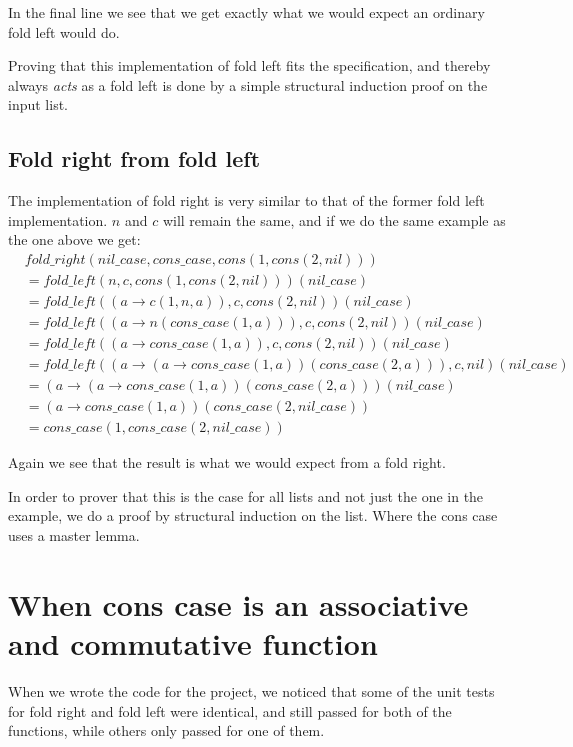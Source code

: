 \documentclass[a4paper]{article}
\begin{document}
In the final line we see that we get exactly what we would expect an ordinary
fold left would do.

Proving that this implementation of fold left fits the specification, and
thereby always \emph{acts} as a fold left is done by a simple structural 
induction proof on the input list.

\subsection{Fold right from fold left}
The implementation of fold right is very similar to that of the former fold left
implementation. $n$ and $c$ will remain the same, and if we do the same example
as the one above we get:
\begin{align*}
        &fold\_right(nil\_case, cons\_case, cons(1,cons(2, nil))) 
  \\ &= fold\_left(n, c, cons(1,cons(2, nil)))(nil\_case)
  \\ &= fold\_left((a \rightarrow c(1, n, a)), c, cons(2,nil))(nil\_case)
  \\ &= fold\_left((a \rightarrow n (cons\_case(1, a))), c, cons(2,nil))(nil\_case)
  \\ &= fold\_left((a \rightarrow cons\_case(1, a)), c, cons(2,nil))(nil\_case)
  \\ &= fold\_left((a \rightarrow (a \rightarrow 
  cons\_case(1,a))(cons\_case(2,a))), c, nil)(nil\_case)
  \\ &= (a \rightarrow (a \rightarrow
  cons\_case(1,a))(cons\_case(2,a)))(nil\_case)
  \\ &= (a \rightarrow cons\_case(1,a))(cons\_case(2, nil\_case))
  \\ &= cons\_case(1,cons\_case(2, nil\_case))
\end{align*}

Again we see that the result is what we would expect from a fold right.

In order to prover that this is the case for all lists and not just the one in
the example, we do a proof by structural induction on the list. Where the cons
case uses a master lemma.

\section{When cons case is an associative and commutative function}
When we wrote the code for the project, we noticed that some of the unit tests
for fold right and fold left were identical, and still passed for both of the
functions, while others only passed for one of them.
\end{document}
